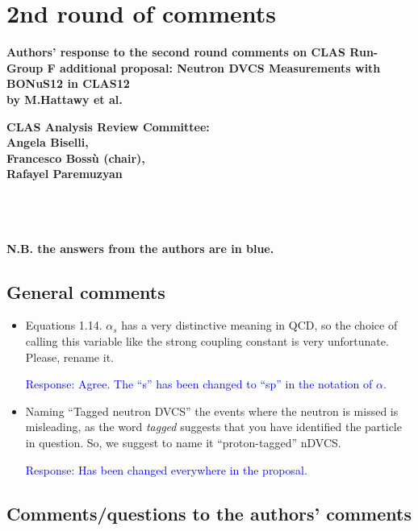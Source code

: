 \chapter{2nd round of comments}
{\bf Authors' response to the second round comments on CLAS Run-Group F 
additional proposal: Neutron DVCS Measurements with BONuS12 in CLAS12 \\ by 
M.Hattawy et al.}
\author{Angela Biselli, Francesco Boss\`u (chair), Rafayel Paremuzyan\\CLAS 
Analysis Review Committee}

{\center \bf CLAS Analysis Review Committee:\\Angela Biselli,\\ Francesco 
Boss\`u (chair),\\ Rafayel Paremuzyan\\}


\def \rarr {\ensuremath{\rightarrow}}
~\\
~\\
~\\

{\bf N.B. the answers from the authors are in blue.} \\ 
 
 \section*{General comments}
 \begin{itemize}
  \item Equations 1.14. $\alpha_s$ has a very distinctive meaning in QCD, so 
     the choice of calling this variable like the strong coupling constant is 
       very unfortunate. Please, rename it.
  
  \textcolor{blue}{Response: Agree. The ``s'' has been changed to ``sp'' in the 
       notation of $\alpha$. }


\item Naming ``Tagged neutron DVCS'' the events where the neutron is missed is 
   misleading, as the word \textit{tagged} suggests that you have identified 
       the particle in question. So, we suggest to name it ``proton-tagged'' 
       nDVCS.

 
  \textcolor{blue}{Response: Has been changed everywhere in the proposal.}
 
 \end{itemize}

 
 
 \section*{Comments/questions to  the authors' comments}
 
